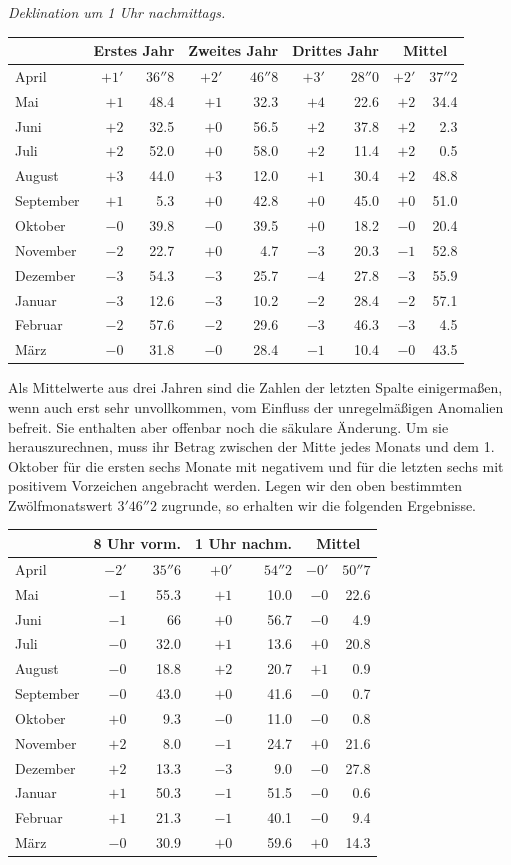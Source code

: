 \begin{center}\small
\textit{Deklination um 1 Uhr nachmittags.}\par\smallskip
\begin{tabular}{l|rr|rr|rr||rr}
&\multicolumn{2}{c|}{Erstes Jahr}&\multicolumn{2}{c|}{Zweites Jahr}&\multicolumn{2}{c||}{Drittes Jahr}&\multicolumn{2}{c}{Mittel}\\\hline
April&$+1'$&$36''8$&$+2'$&$46''8$&$+3'$&$28''0$&$+2'$&$37''2$\\
Mai&$+1$&48.4&$+1$&32.3&$+4$&22.6&$+2$&34.4\\
Juni&$+2$&32.5&$+0$&56.5&$+2$&37.8&$+2$&2.3\\
Juli&$+2$&52.0&$+0$&58.0&$+2$&11.4&$+2$&0.5\\
August&$+3$&44.0&$+3$&12.0&$+1$&30.4&$+2$&48.8\\
September&$+1$&5.3&$+0$&42.8&$+0$&45.0&$+0$&51.0\\
Oktober&$-0$&39.8&$-0$&39.5&$+0$&18.2&$-0$&20.4\\
November&$-2$&22.7&$+0$&4.7&$-3$&20.3&$-1$&52.8\\
Dezember&$-3$&54.3&$-3$&25.7&$-4$&27.8&$-3$&55.9\\
Januar&$-3$&12.6&$-3$&10.2&$-2$&28.4&$-2$&57.1\\
Februar&$-2$&57.6&$-2$&29.6&$-3$&46.3&$-3$&4.5\\
März&$-0$&31.8&$-0$&28.4&$-1$&10.4&$-0$&43.5
\end{tabular}
\end{center}
Als Mittelwerte aus drei Jahren sind die Zahlen der letzten Spalte einigermaßen, wenn auch erst sehr unvollkommen, vom Einfluss der unregelmäßigen Anomalien befreit. Sie enthalten aber offenbar noch die säkulare Änderung. Um sie herauszurechnen, muss ihr Betrag zwischen der
Mitte jedes Monats und dem 1. Oktober für die ersten sechs Monate mit negativem und für die letzten sechs mit positivem Vorzeichen angebracht werden. Legen wir den oben bestimmten Zwölfmonatswert $3'46''2$ zugrunde, so erhalten wir die folgenden Ergebnisse.
\begin{center}\small
\begin{tabular}{l|rr|rr||rr}
&\multicolumn{2}{c|}{8 Uhr vorm.}&\multicolumn{2}{c||}{1 Uhr nachm.}&\multicolumn{2}{c}{Mittel}\\\hline
April&$-2'$&$35''6$&$+0'$&$54''2$&$-0'$&$50''7$\\
Mai&$-1$&55.3&$+1$&10.0&$-0$&22.6\\
Juni&$-1$&6\phantom{.}6&$+0$&56.7&$-0$&4.9\\
Juli&$-0$&32.0&$+1$&13.6&$+0$&20.8\\
August&$-0$&18.8&$+2$&20.7&$+1$&0.9\\
September&$-0$&43.0&$+0$&41.6&$-0$&0.7\\
Oktober&$+0$&9.3&$-0$&11.0&$-0$&0.8\\
November&$+2$&8.0&$-1$&24.7&$+0$&21.6\\
Dezember&$+2$&13.3&$-3$&9.0&$-0$&27.8\\
Januar&$+1$&50.3&$-1$&51.5&$-0$&0.6\\
Februar&$+1$&21.3&$-1$&40.1&$-0$&9.4\\
März&$-0$&30.9&$+0$&59.6&$+0$&14.3
\end{tabular}
\end{center}
